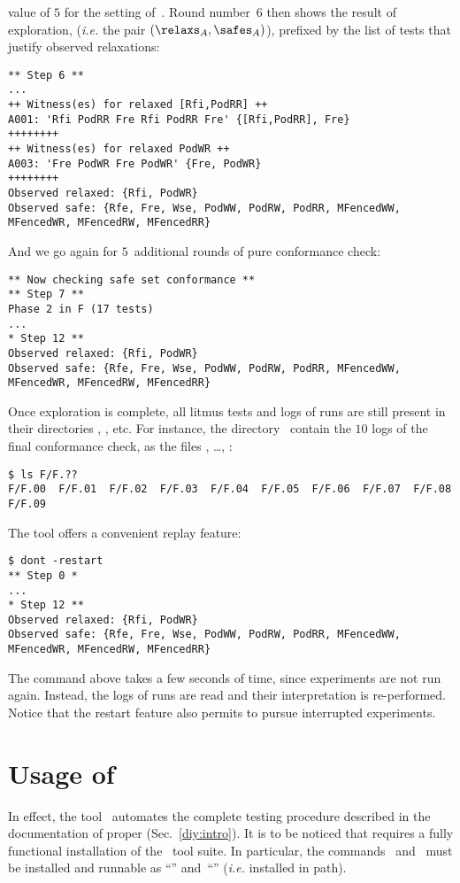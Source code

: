 value of $5$ for the setting of~.
Round number~$6$ then shows the result of exploration,
(\emph{i.e.} the pair $(\relaxs_{A}, \safes_{A})$), prefixed
by the list of tests that justify observed relaxations:
\begin{verbatim}
** Step 6 **
...
++ Witness(es) for relaxed [Rfi,PodRR] ++
A001: 'Rfi PodRR Fre Rfi PodRR Fre' {[Rfi,PodRR], Fre}
++++++++
++ Witness(es) for relaxed PodWR ++
A003: 'Fre PodWR Fre PodWR' {Fre, PodWR}
++++++++
Observed relaxed: {Rfi, PodWR}
Observed safe: {Rfe, Fre, Wse, PodWW, PodRW, PodRR, MFencedWW, MFencedWR, MFencedRW, MFencedRR}
\end{verbatim}
And we go again for $5$~additional rounds of pure conformance check:
\begin{verbatim}
** Now checking safe set conformance **
** Step 7 **
Phase 2 in F (17 tests)
...
* Step 12 **
Observed relaxed: {Rfi, PodWR}
Observed safe: {Rfe, Fre, Wse, PodWW, PodRW, PodRR, MFencedWW, MFencedWR, MFencedRW, MFencedRR}
\end{verbatim}


Once exploration is complete, all litmus tests and logs of \litmus{} runs are
still present in their directories , , etc.
For instance, the directory~ contain the $10$ logs of the final
conformance check, as the files , \ldots, :
\begin{verbatim}
$ ls F/F.??
F/F.00  F/F.01  F/F.02  F/F.03  F/F.04  F/F.05  F/F.06  F/F.07  F/F.08  F/F.09
\end{verbatim}

The tool \dont{} offers a convenient replay feature:
\begin{verbatim}
$ dont -restart
** Step 0 *
...
* Step 12 **
Observed relaxed: {Rfi, PodWR}
Observed safe: {Rfe, Fre, Wse, PodWW, PodRW, PodRR, MFencedWW, MFencedWR, MFencedRW, MFencedRR}
\end{verbatim}
The command above takes a few seconds of time, since experiments
are not run again. Instead, the logs of \litmus{} runs are read and
their interpretation is re-performed.
Notice that the restart feature also permits to pursue interrupted
experiments.

\section{Usage of~\dont}
In effect, the tool~\dont{} automates the complete testing
procedure described in the documentation of \diy{} proper
(Sec.~\ref{diy:intro}).
It is to be noticed that \dont{} requires a fully functional installation
of the \diy~tool suite.
In particular, the commands~\diy{} and~\litmus{} must be installed
and runnable as ``\diy'' and~``\litmus'' (\emph{i.e.} installed in path).




